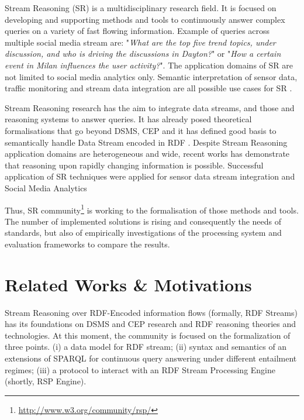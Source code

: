 Stream Reasoning (SR) is a multidisciplinary research field. It is focused on developing and supporting methods and tools to continuously answer complex queries on a variety of fast flowing information. Example of queries across multiple social media stream are: "\textit{What are the top five trend topics, under discussion, and who is driving the discussions in Dayton?}" or "\textit{How a certain event in Milan influences the user activity?}". The application domains of SR are not limited to social media analytics only. Semantic interpretation of sensor data, traffic monitoring and stream data integration are all possible use cases for SR \cite{DBLP:journals/expert/ValleCHF09}.

Stream Reasoning research has the aim to integrate data streams, and those and reasoning systems to answer queries. It has already posed theoretical formalisations that go beyond DSMS, CEP  \cite{DBLP:conf/debs/KomazecCF12, Lephuoc2011, 4618773} and it has defined good basis to semantically handle Data Stream encoded in RDF \cite{DBLP:conf/fis/ValleCBBC08, DBLP:journals/sigmod/BarbieriBCVG10}. Despite Stream Reasoning application domains are heterogeneous and wide, recent works has demonstrate that reasoning upon rapidly changing information is possible. Successful application of SR techniques were applied for sensor data stream integration \cite{DBLP:journals/ijswis/CalbimonteJCA12,DBLP:journals/ws/LecueTHTBST14}  and Social Media Analytics \cite{DBLP:journals/ws/BalduiniCDVHLKT12}

Thus, SR community\footnote{\url{http://www.w3.org/community/rsp/}} is working to the formalisation of those methods and tools. The number of implemented solutions is rising and consequently the needs of standards, but also of empirically investigations of the processing system and evaluation frameworks to compare the results.


\section{Related Works \& Motivations}\label{sec:motivations-intro}

Stream Reasoning over RDF-Encoded information flows (formally, RDF Streams) has its foundations on DSMS and CEP research and RDF reasoning theories and technologies. At this moment, the community is focused on the formalization of three points.  (i) a data model for RDF stream; (ii) syntax and semantics of an extensions of SPARQL for continuous query answering under different entailment regimes; (iii) a protocol to interact with an RDF Stream Processing Engine (shortly, RSP Engine). 

